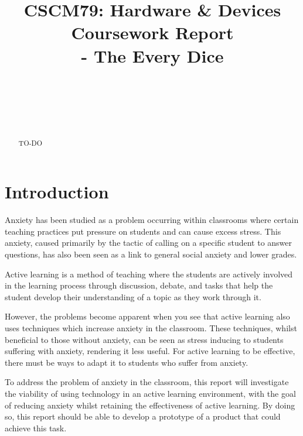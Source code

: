 \documentclass{sigchi}
\begin{document}
\title{CSCM79: Hardware \& Devices Coursework Report \\- The Every Dice}

\author{%
  \\
  \\
  \\
  \\
}

\maketitle

\begin{abstract}
  TO-DO
\end{abstract}

\section{Introduction}

  Anxiety has been studied as a problem occurring within classrooms where certain teaching practices put pressure on students and can cause excess stress. This anxiety, caused primarily by the tactic of calling on a specific student to answer questions, has also been seen as a link to general social anxiety and lower grades.  

  Active learning is a method of teaching where the students are actively involved in the learning process through discussion, debate, and tasks that help the student develop their understanding of a topic as they work through it. 

  However, the problems become apparent when you see that active learning also uses techniques which increase anxiety in the classroom. These techniques, whilst beneficial to those without anxiety, can be seen as stress inducing to students suffering with anxiety, rendering it less useful. For active learning to be effective, there must be ways to adapt it to students who suffer from anxiety. 

  To address the problem of anxiety in the classroom, this report will investigate the viability of using technology in an active learning environment, with the goal of reducing anxiety whilst retaining the effectiveness of active learning. By doing so, this report should be able to develop a prototype of a product that could achieve this task. 
\end{document}

